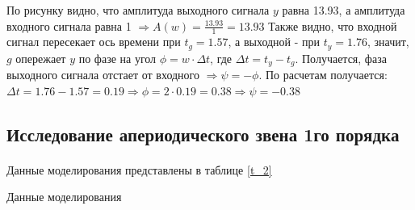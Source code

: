 \documentclass[a4paper,12pt]{article}
\begin{document}
	По рисунку видно, что амплитуда выходного сигнала $y$ равна 13.93, а амплитуда входного сигнала равна 1 $\Rightarrow A(w)=\frac{13.93}{1}=13.93$ Также видно, что входной сигнал пересекает ось времени при $t_g=1.57$, а выходной - при $t_y=1.76$, значит, $g$ опережает $y$ по фазе на угол $\phi=w\cdot \Delta t$, где $\Delta t=t_y-t_g$. Получается, фаза выходного сигнала отстает от входного $\Rightarrow \psi=-\phi$. По расчетам получается: $\Delta t = 1.76-1.57=0.19 \Rightarrow \phi=2\cdot0.19=0.38 \Rightarrow \psi=-0.38$     
	
	




	\newpage
	\begin{center}
	\section{Исследование апериодического звена 1го порядка}
	\end{center}
	\paragraph{} Данные моделирования представлены в таблице \ref{t_2}
	
		\begin{table}[h!]
			\centering
			\begin{threeparttable}
				\caption{Данные моделирования} \label{t_2}
			\end{threeparttable}
		\end{table}
	\newpage
\end{document}
